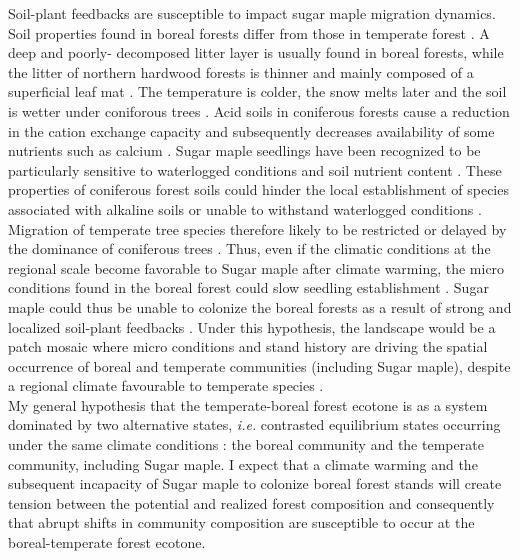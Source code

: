 Soil-plant feedbacks are susceptible to impact sugar maple migration dynamics.
Soil properties found in boreal forests differ from those in temperate forest
\cite{Lafleur2010,Barras1998,Goldblum2010,Demers1998}. A deep and poorly-
decomposed  litter layer is usually found in boreal forests, while the litter
of  northern hardwood forests is thinner and mainly composed of a superficial
leaf mat \cite{Barras1998}. The temperature is colder, the snow melts later
and the soil is wetter under coniforous trees \cite{Lafleur2010,Goldblum2010}.
Acid soils in coniferous forests cause a reduction in the cation exchange
capacity and subsequently decreases availability of some nutrients such as
calcium \cite{Moore2008}. Sugar maple seedlings have been recognized to be
particularly sensitive to waterlogged conditions and soil nutrient content
\cite{Moore2008,Lafleur2010,Cleavitt2011}. These properties of coniferous
forest soils could hinder the local establishment of species associated with
alkaline soils or unable to withstand waterlogged conditions
\cite{Lafleur2010}. Migration of temperate tree species therefore likely to be
restricted or delayed by the dominance of coniferous trees \cite{Lafleur2010}.
Thus, even if the climatic conditions at the regional scale become favorable
to Sugar maple after climate warming, the micro conditions found in the boreal
forest could slow seedling establishment
\cite{Kellman2004,Moore2008,Barras1998,Messier2011}. Sugar maple could thus be
unable to colonize the boreal forests as a result of strong and localized
soil-plant feedbacks \cite{McCarthyNeumann2012}. Under this hypothesis, the
landscape would be a patch mosaic where micro conditions and stand history are
driving the spatial occurrence of boreal and temperate communities (including
Sugar maple), despite a regional climate favourable to temperate species
\cite{Goldblum2010}.\\

My general hypothesis that the temperate-boreal forest ecotone is as a system
dominated by two alternative states, \textit{i.e.} contrasted equilibrium
states occurring under the same climate conditions
\cite{scheffer2009critical}: the boreal community and the temperate community,
including Sugar maple. I expect
that a climate warming and the subsequent incapacity of Sugar maple to
colonize boreal forest stands will create  tension between the potential and
realized forest composition and consequently that abrupt shifts in community
composition are susceptible to occur at the boreal-temperate forest ecotone.\\

